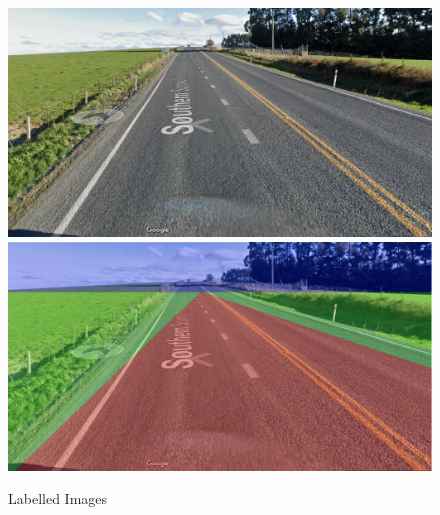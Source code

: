 \documentclass[conference]{IEEEtran}
\begin{document}
\begin{figure}[h]
\begin{minipage}{.3\textwidth}
        \includegraphics[height=.7\textwidth, width=\textwidth]{images/UnlabelledDemo3.png}
        \\ \includegraphics[height=.7\textwidth, width=\textwidth]{images/LabelledDemo3.png}    
    \end{minipage}
    \caption{Labelled Images}
    \label{fig:labelresults}
\end{figure}
\end{document}
